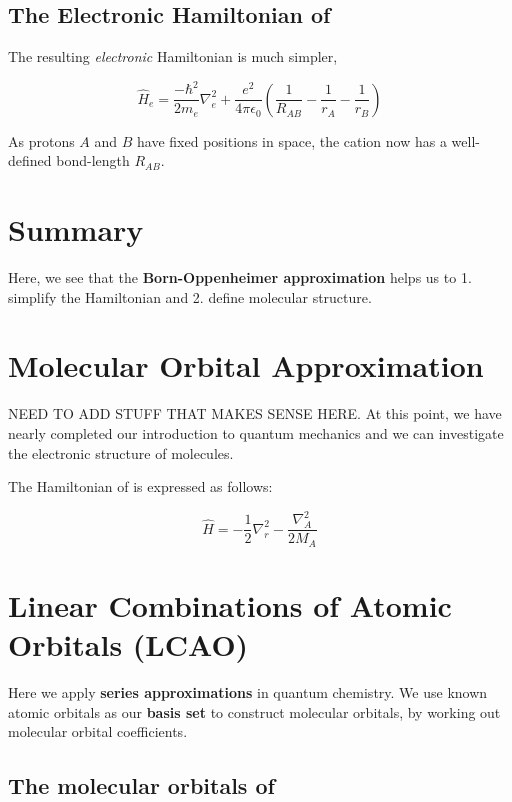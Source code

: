 \documentclass[a4paper]{tufte-handout}
\theoremstyle{definition}
\begin{document}
\subsection{The Electronic Hamiltonian of }

The resulting \textit{electronic} Hamiltonian is much simpler,

\begin{equation}
  \hat{H}_e = \frac{-\hbar^2}{2m_e}\nabla^2_e + \frac{e^2}{4\pi\epsilon_0} \left( \frac{1}{R_{AB}} - \frac{1}{r_{A}} - \frac{1}{r_{B}} \right)
\end{equation}

As protons $A$ and $B$ have fixed positions in space, the  cation now has a well-defined bond-length $R_{AB}$.

\section{Summary}

Here, we see that the \textbf{Born-Oppenheimer approximation} helps us to 1. simplify the Hamiltonian and 2. define molecular structure.


\section{Molecular Orbital Approximation}

NEED TO ADD STUFF THAT MAKES SENSE HERE. At this point, we have nearly completed our introduction to quantum mechanics 
and we can investigate the electronic structure of molecules.

The Hamiltonian of  is expressed as follows:

\begin{equation}
  \hat{H} = -\frac{1}{2}\nabla^2_r - \frac{\nabla^2_A}{2M_A}
\end{equation}

\section{Linear Combinations of Atomic Orbitals (LCAO)}
Here we apply \textbf{series approximations} in quantum chemistry. We use
known atomic orbitals as our \textbf{basis set} to construct molecular orbitals,
by working out molecular orbital coefficients.

\subsection{The molecular orbitals of }
\end{document}
